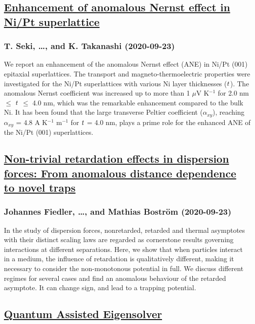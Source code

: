 \subsection*{\href{http://arxiv.org/abs/2009.11006v1}{Enhancement of anomalous Nernst effect in Ni/Pt superlattice}}
\subsubsection*{T. Seki, \dots, and K. Takanashi (2020-09-23)}
We report an enhancement of the anomalous Nernst effect (ANE) in Ni/Pt (001)
epitaxial superlattices. The transport and magneto-thermoelectric properties
were investigated for the Ni/Pt superlattices with various Ni layer thicknesses
(${\it t}$). The anomalous Nernst coefficient was increased up to more than 1
${\mu}$V K$^{-1}$ for 2.0 nm ${\leq}$ ${\it t}$ ${\leq}$ 4.0 nm, which was the
remarkable enhancement compared to the bulk Ni. It has been found that the
large transverse Peltier coefficient (${\alpha}$$_{xy}$), reaching
${\alpha}$$_{xy}$ = 4.8 A K$^{-1}$ m$^{-1}$ for ${\it t}$ = 4.0 nm, plays a
prime role for the enhanced ANE of the Ni/Pt (001) superlattices.

\subsection*{\href{http://arxiv.org/abs/2009.11003v1}{Non-trivial retardation effects in dispersion forces: From anomalous  distance dependence to novel traps}}
\subsubsection*{Johannes Fiedler, \dots, and Mathias Boström (2020-09-23)}
In the study of dispersion forces, nonretarded, retarded and thermal
asymptotes with their distinct scaling laws are regarded as cornerstone results
governing interactions at different separations. Here, we show that when
particles interact in a medium, the influence of retardation is qualitatively
different, making it necessary to consider the non-monotonous potential in
full. We discuss different regimes for several cases and find an anomalous
behaviour of the retarded asymptote. It can change sign, and lead to a trapping
potential.

\subsection*{\href{http://arxiv.org/abs/2009.11001v1}{Quantum Assisted Eigensolver}}
